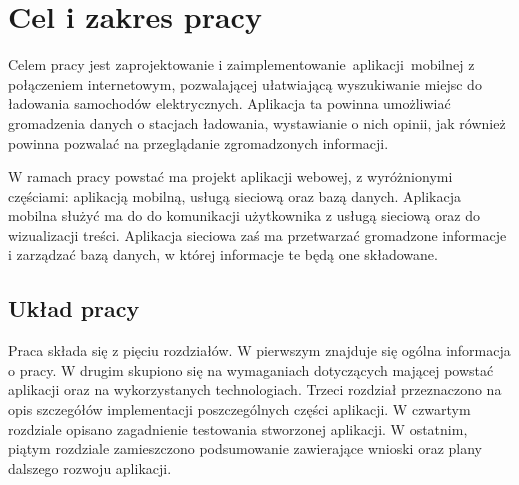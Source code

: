 \section{Cel i zakres pracy}
Celem pracy jest zaprojektowanie i zaimplementowanie aplikacji mobilnej z połączeniem internetowym, pozwalającej ułatwiającą wyszukiwanie miejsc do ładowania samochodów elektrycznych. Aplikacja ta powinna umożliwiać gromadzenia danych o stacjach ładowania, wystawianie o nich opinii, jak również powinna pozwalać na przeglądanie zgromadzonych informacji. 

W ramach pracy powstać ma projekt aplikacji webowej, z wyróżnionymi częściami: aplikacją mobilną, usługą sieciową oraz bazą danych.
Aplikacja mobilna służyć ma do do komunikacji użytkownika z usługą sieciową oraz do wizualizacji treści.
Aplikacja sieciowa zaś ma przetwarzać gromadzone informacje i zarządzać bazą danych, w której informacje te będą one składowane.

\subsection{Układ pracy}
Praca składa się z pięciu rozdziałów. W pierwszym znajduje się ogólna informacja o pracy.
W drugim skupiono się na wymaganiach dotyczących mającej powstać aplikacji oraz na wykorzystanych technologiach.
Trzeci rozdział przeznaczono na opis szczegółów implementacji poszczególnych części aplikacji.
W czwartym rozdziale opisano zagadnienie testowania stworzonej aplikacji.
W ostatnim, piątym rozdziale zamieszczono podsumowanie zawierające wnioski oraz plany dalszego rozwoju aplikacji.